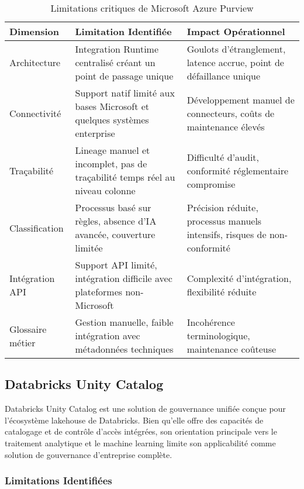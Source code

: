 \begin{table}[htpb]
\centering
\caption{Limitations critiques de Microsoft Azure Purview}
\label{tab:limitations_purview}
\renewcommand{\arraystretch}{1.3}
\setlength{\tabcolsep}{8pt}
\small
\begin{tabularx}{\textwidth}{>{\RaggedRight\arraybackslash}X>{\RaggedRight\arraybackslash}X>{\RaggedRight\arraybackslash}X}
\toprule
\textbf{Dimension} & \textbf{Limitation Identifiée} & \textbf{Impact Opérationnel} \\
\midrule
Architecture & Integration Runtime centralisé créant un point de passage unique & Goulots d'étranglement, latence accrue, point de défaillance unique \\
\addlinespace
Connectivité & Support natif limité aux bases Microsoft et quelques systèmes enterprise & Développement manuel de connecteurs, coûts de maintenance élevés \\
\addlinespace
Traçabilité & Lineage manuel et incomplet, pas de traçabilité temps réel au niveau colonne & Difficulté d'audit, conformité réglementaire compromise \\
\addlinespace
Classification & Processus basé sur règles, absence d'IA avancée, couverture limitée & Précision réduite, processus manuels intensifs, risques de non-conformité \\
\addlinespace
Intégration API & Support API limité, intégration difficile avec plateformes non-Microsoft & Complexité d'intégration, flexibilité réduite \\
\addlinespace
Glossaire métier & Gestion manuelle, faible intégration avec métadonnées techniques & Incohérence terminologique, maintenance coûteuse \\
\bottomrule
\end{tabularx}
\end{table}

\subsection{Databricks Unity Catalog}

Databricks Unity Catalog est une solution de gouvernance unifiée conçue pour l'écosystème lakehouse de Databricks. Bien qu'elle offre des capacités de catalogage et de contrôle d'accès intégrées, son orientation principale vers le traitement analytique et le machine learning limite son applicabilité comme solution de gouvernance d'entreprise complète.

\subsubsection{Limitations Identifiées}

